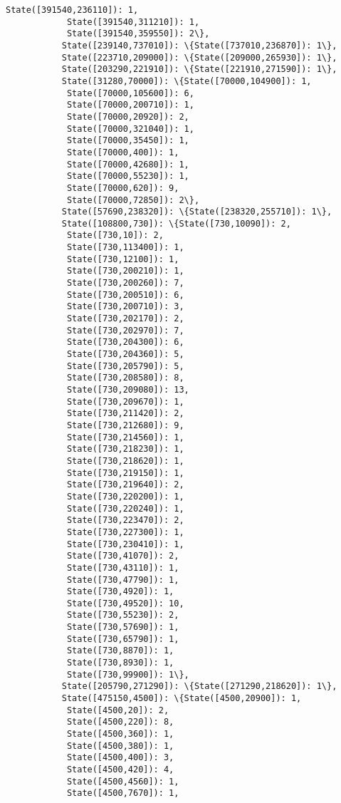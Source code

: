 \documentclass[11pt]{article}
\begin{document}
\begin{Verbatim}[commandchars=\\\{\}]
            State([391540,236110]): 1,
            State([391540,311210]): 1,
            State([391540,359550]): 2\},
           State([239140,737010]): \{State([737010,236870]): 1\},
           State([223710,209000]): \{State([209000,265930]): 1\},
           State([203290,221910]): \{State([221910,271590]): 1\},
           State([31280,70000]): \{State([70000,104900]): 1,
            State([70000,105600]): 6,
            State([70000,200710]): 1,
            State([70000,20920]): 2,
            State([70000,321040]): 1,
            State([70000,35450]): 1,
            State([70000,400]): 1,
            State([70000,42680]): 1,
            State([70000,55230]): 1,
            State([70000,620]): 9,
            State([70000,72850]): 2\},
           State([57690,238320]): \{State([238320,255710]): 1\},
           State([108800,730]): \{State([730,10090]): 2,
            State([730,10]): 2,
            State([730,113400]): 1,
            State([730,12100]): 1,
            State([730,200210]): 1,
            State([730,200260]): 7,
            State([730,200510]): 6,
            State([730,200710]): 3,
            State([730,202170]): 2,
            State([730,202970]): 7,
            State([730,204300]): 6,
            State([730,204360]): 5,
            State([730,205790]): 5,
            State([730,208580]): 8,
            State([730,209080]): 13,
            State([730,209670]): 1,
            State([730,211420]): 2,
            State([730,212680]): 9,
            State([730,214560]): 1,
            State([730,218230]): 1,
            State([730,218620]): 1,
            State([730,219150]): 1,
            State([730,219640]): 2,
            State([730,220200]): 1,
            State([730,220240]): 1,
            State([730,223470]): 2,
            State([730,227300]): 1,
            State([730,230410]): 1,
            State([730,41070]): 2,
            State([730,43110]): 1,
            State([730,47790]): 1,
            State([730,4920]): 1,
            State([730,49520]): 10,
            State([730,55230]): 2,
            State([730,57690]): 1,
            State([730,65790]): 1,
            State([730,8870]): 1,
            State([730,8930]): 1,
            State([730,99900]): 1\},
           State([205790,271290]): \{State([271290,218620]): 1\},
           State([475150,4500]): \{State([4500,20900]): 1,
            State([4500,20]): 2,
            State([4500,220]): 8,
            State([4500,360]): 1,
            State([4500,380]): 1,
            State([4500,400]): 3,
            State([4500,420]): 4,
            State([4500,4560]): 1,
            State([4500,7670]): 1,

\end{Verbatim}
\end{document}

